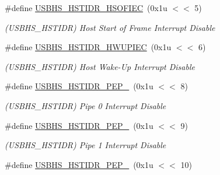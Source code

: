 \begin{DoxyCompactItemize}
\mbox{\label{group__SAME70__USBHS_gafe37ad9df8dcc435346c4a9dd26c8276}} 
\#define \mbox{\hyperlink{group__SAME70__USBHS_gafe37ad9df8dcc435346c4a9dd26c8276}{U\+S\+B\+H\+S\+\_\+\+H\+S\+T\+I\+D\+R\+\_\+\+H\+S\+O\+F\+I\+EC}}~(0x1u $<$$<$ 5)
\begin{DoxyCompactList}\small\item\em (U\+S\+B\+H\+S\+\_\+\+H\+S\+T\+I\+DR) Host Start of Frame Interrupt Disable \end{DoxyCompactList}\item 
\mbox{\label{group__SAME70__USBHS_gad76e639effe266e8ea166bc9c5faf889}} 
\#define \mbox{\hyperlink{group__SAME70__USBHS_gad76e639effe266e8ea166bc9c5faf889}{U\+S\+B\+H\+S\+\_\+\+H\+S\+T\+I\+D\+R\+\_\+\+H\+W\+U\+P\+I\+EC}}~(0x1u $<$$<$ 6)
\begin{DoxyCompactList}\small\item\em (U\+S\+B\+H\+S\+\_\+\+H\+S\+T\+I\+DR) Host Wake-\/\+Up Interrupt Disable \end{DoxyCompactList}\item 
\mbox{\label{group__SAME70__USBHS_gadb27e9e72459e863c26266f9f79b7df1}} 
\#define \mbox{\hyperlink{group__SAME70__USBHS_gadb27e9e72459e863c26266f9f79b7df1}{U\+S\+B\+H\+S\+\_\+\+H\+S\+T\+I\+D\+R\+\_\+\+P\+E\+P\+\_}}~(0x1u $<$$<$ 8)
\begin{DoxyCompactList}\small\item\em (U\+S\+B\+H\+S\+\_\+\+H\+S\+T\+I\+DR) Pipe 0 Interrupt Disable \end{DoxyCompactList}\item 
\mbox{\label{group__SAME70__USBHS_ga7bb1a54b0b9a25a26524177876943ea8}} 
\#define \mbox{\hyperlink{group__SAME70__USBHS_ga7bb1a54b0b9a25a26524177876943ea8}{U\+S\+B\+H\+S\+\_\+\+H\+S\+T\+I\+D\+R\+\_\+\+P\+E\+P\+\_}}~(0x1u $<$$<$ 9)
\begin{DoxyCompactList}\small\item\em (U\+S\+B\+H\+S\+\_\+\+H\+S\+T\+I\+DR) Pipe 1 Interrupt Disable \end{DoxyCompactList}\item 
\mbox{\label{group__SAME70__USBHS_gaca8cd64c1c4800bcb2635da7e905cc5a}} 
\#define \mbox{\hyperlink{group__SAME70__USBHS_gaca8cd64c1c4800bcb2635da7e905cc5a}{U\+S\+B\+H\+S\+\_\+\+H\+S\+T\+I\+D\+R\+\_\+\+P\+E\+P\+\_}}~(0x1u $<$$<$ 10)
$$
\end{DoxyCompactItemize}
